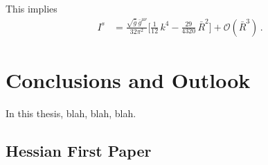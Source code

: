 \documentclass[11pt]{book} %
\begin{document}
{This implies
\begin{align}
  I^s &= \frac{ \sqrt{\bar g} \, \bar g^{\mu\nu} }{ 32 \pi^2 }
  \bigg[
    \frac{1}{12} \, k^4  - \frac{29}{4320} \, \bar R^2
  \bigg]
  + \mathcal O (\bar R^3) \,.
\end{align}



\chapter*{Conclusions and Outlook}

In this thesis, blah, blah, blah.


\nocite{*}




\begin{appendices}
  \chapter{Hessian First Paper}


\end{appendices}}
\end{document}
